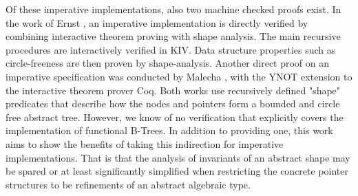 Of these imperative implementations, also two machine checked proofs exist.
In the work of Ernst \parencite{DBLP:journals/sosym/ErnstSR15},
an imperative implementation is directly verified
by combining interactive theorem proving 
with shape analysis.
The main recursive procedures are interactively verified in KIV.
Data structure properties such as circle-freeness are then proven by shape-analysis.
Another direct proof on an imperative specification 
was conducted by Malecha \parencite{DBLP:conf/popl/MalechaMSW10}, with the YNOT
extension to the interactive theorem prover Coq.
Both works use recursively defined "shape" predicates
that describe how the nodes and pointers
form a bounded and circle free abstract tree.
However, we know of no verification that explicitly covers
the implementation of functional B-Trees.
In addition to providing one, this work aims to show the benefits
of taking this indirection for imperative implementations.
That is that the analysis of invariants of an abstract shape may be spared
or at least significantly simplified when
restricting the concrete pointer structures to be refinements
of an abstract algebraic type.